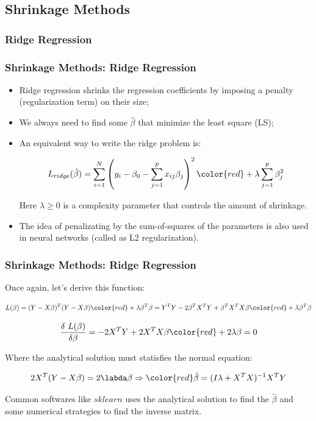 \subsection {Shrinkage Methods}

\subsubsection{Ridge Regression}

\begin{frame}
    \frametitle{Shrinkage Methods: Ridge Regression}
 
    \begin{itemize}
        \item Ridge regression shrinks the regression coefficients by imposing a 
        penalty (regularization term) on their size;

        \item We always need to find some $\hat{\beta}$ that minimize the least square (LS);

        \item An equivalent way to write the ridge problem is:

        $$L_{ridge}(\hat{\beta}) = \sum_{i=1}^{N}\left(y_i - \beta_0 - \sum_{j=1}^{p}x_{ij}\beta_j\right)^2 {\color{red} + \lambda\sum_{j=1}^{p}\beta_{j}^{2} }$$ 
        
        Here $\lambda\geqslant 0$ is a complexity parameter that controls the amount of shrinkage.

        \item The idea of penalizating by the sum-of-squares of the parameters is also used in 
        neural networks (called as L2 regularization).


    \end{itemize}

\end{frame}


\begin{frame}
    \frametitle{Shrinkage Methods: Ridge Regression}
 
    Once again, let's derive this function:

    \small
    $$L(\beta) = (Y-X\beta)^T(Y-X\beta) {\color{red}+ \lambda\beta^T\beta} = Y^TY - 2\beta^TX^TY + \beta^TX^TX\beta {\color{red}+ \lambda\beta^T\beta}$$

    $$\frac{\delta~L(\beta)}{\delta\beta} = -2X^TY + 2X^TX\beta {\color{red}+2\lambda\beta} = 0$$

    Where the analytical solution must statisfies the normal equation:

    $$ 2X^T(Y - X\beta) = 2\labda\beta \Rightarrow {\color{red}\hat{\beta} = (I\lambda + X^TX)^{-1}X^TY}$$

    Common softwares like $sklearn$ uses the analytical solution to find the $\hat{\beta}$ and 
    some numerical strategies to find the inverse matrix.

\end{frame}




